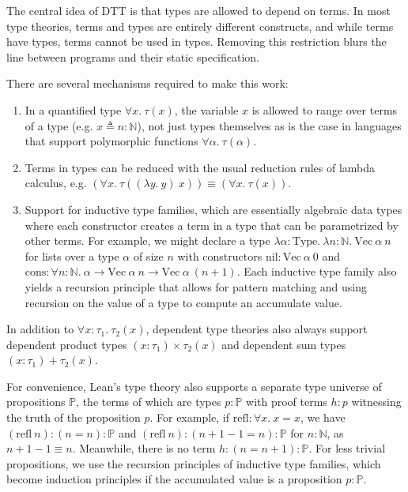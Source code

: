 The central idea of DTT is that types are allowed to depend on terms. In most type theories, terms and types are entirely different constructs, and while terms have types, terms cannot be used in types. Removing this restriction blurs the line between programs and their static specification.

There are several mechanisms required to make this work: 
\begin{enumerate}
	\item In a quantified type $\forall x.\ \tau(x)$, the variable $x$ is allowed to range over terms of a type (e.g. $x \triangleq n : \mathbb{N}$), not just types themselves as is the case in languages that support polymorphic functions $\forall \alpha.\ \tau(\alpha)$.
	\item Terms in types can be reduced with the usual reduction rules of lambda calculus, e.g. $(\forall x.\ \tau((\lambda y.\ y)\ x)) \equiv (\forall x.\ \tau(x))$.
	\item Support for inductive type families, which are essentially algebraic data types where each constructor creates a term in a type that can be parametrized by other terms. For example, we might declare a type $\lambda \alpha : \mathrm{Type}.\ \lambda n : \mathbb{N}.\ \mathrm{Vec}\ \alpha\ n$ for lists over a type $\alpha$ of size $n$ with constructors $\mathrm{nil} : \mathrm{Vec}\ \alpha\ 0$ and $\mathrm{cons} : \forall n : \mathbb{N}.\ \alpha \to \mathrm{Vec}\ \alpha\ n \to \mathrm{Vec}\ \alpha\ (n+1)$. Each inductive type family also yields a recursion principle that allows for pattern matching and using recursion on the value of a type to compute an accumulate value.
\end{enumerate}

In addition to $\forall x : \tau_1.\ \tau_2(x)$, dependent type theories also always support dependent product types $(x : \tau_1) \times \tau_2(x)$ and dependent sum types $(x : \tau_1) + \tau_2(x)$.

For convenience, Lean's type theory also supports a separate type universe of propositions $\mathbb{P}$, the terms of which are types $p : \mathbb{P}$ with proof terms $h : p$ witnessing the truth of the proposition $p$. For example, if $\mathrm{refl} : \forall x.\ x = x$, we have $(\mathrm{refl}\ n) : (n = n) : \mathbb{P}$ and $(\mathrm{refl}\ n) : (n + 1 - 1 = n) : \mathbb{P}$ for $n : \mathbb{N}$, as $n + 1 - 1 \equiv n$. Meanwhile, there is no term $h : (n = n + 1) : \mathbb{P}$. For less trivial propositions, we use the recursion principles of inductive type families, which become induction principles if the accumulated value is a proposition $p : \mathbb{P}$. 

